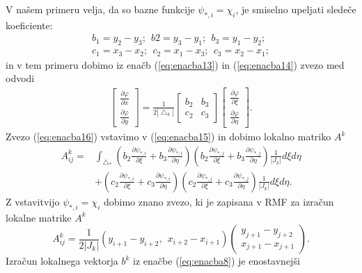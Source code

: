 \documentclass[12pt,a4paper]{article}
\begin{document}
V našem primeru velja, da so bazne funkcije $\psi _{*,i}=\chi _i$, je smiselno upeljati sledeče koeficiente:
\begin{align*}
b_1= y_2 -y_3; \ \ b2= y_3 -y_1; \ \ b_3= y_1 -y_2; \\
c_1 = x_3 -x_2; \ \ c_2 = x_1 -x_3; \ \ c_3 = x_2 -x_1;
\end{align*}
in v tem primeru dobimo iz enačb (\ref{eq:enacba13}) in (\ref{eq:enacba14}) zvezo med odvodi
\begin{align} \label{eq:enacba16}
\begin{bmatrix}
\frac{ \partial \varphi}{\partial x}\\ 
\frac{\partial \varphi}{\partial y }
\end{bmatrix} = \frac{1}{2|\bigtriangleup _k|}
\begin{bmatrix}
 b_2& b_3\\ 
 c_2& c_3
\end{bmatrix}
\begin{bmatrix}
 \frac{ \partial \varphi}{\partial \xi}\\ 
\frac{\partial \varphi}{\partial \eta }
\end{bmatrix}.
\end{align}
Zvezo (\ref{eq:enacba16}) vstavimo v (\ref{eq:enacba15}) in dobimo lokalno matriko $A^{k}$
\begin{align*}
A_{ij}^{k} =& \int _{\bigtriangleup _*} \left( b_2 \frac{\partial \psi_{*,i}}{\partial \xi} + b_3 \frac{ \partial \psi _{*,i}}{\partial \eta} \right)
\left( b_2 \frac{\partial \psi_{*,j}}{\partial \xi} + b_3 \frac{ \partial \psi _{*,j}}{\partial \eta} \right) \frac{1}{|J_k|} d\xi d\eta \\
&+ \left( c_2 \frac{\partial \psi_{*,i}}{\partial \xi} + c_3 \frac{ \partial \psi _{*,i}}{\partial \eta} \right)
\left( c_2 \frac{\partial \psi_{*,j}}{\partial \xi} + c_3 \frac{ \partial \psi _{*,j}}{\partial \eta} \right) \frac{1}{|J_k|} d\xi d\eta.
\end{align*}
Z vstavitvijo $\psi _{*,i}= \chi _i$ dobimo znano zvezo, ki je zapisana v RMF za izračun lokalne matrike $A^{k}$
\begin{equation} \label{eq:enacba17}
A^{k}_{ij}=\frac{1}{2|J_k|} (y_{i+1} - y_{i+2} , \ \ x_{i+2} - x_{i+1})
\begin{pmatrix}
 y_{j+1} - y_{j+2} \\ x_{j+1} - x_{j+1}
\end{pmatrix}.
\end{equation}
Izračun lokalnega vektorja $b^{k}$ iz enačbe (\ref{eq:enacba8}) je enostavnejši
\end{document}
